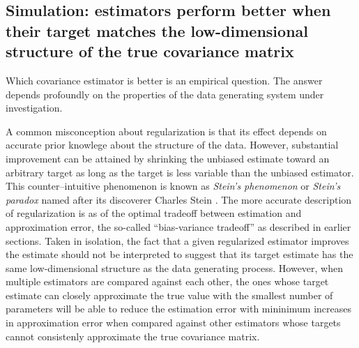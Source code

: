 \subsection*{Simulation: estimators perform better when their target matches the low-dimensional structure of the true covariance matrix}


Which covariance estimator is better is an empirical question.  The answer depends profoundly on the properties of the data generating system under investigation. 

A common misconception about regularization is that its effect depends on accurate prior knowlege about the structure of the data. However, substantial improvement can be attained by shrinking the unbiased estimate toward an arbitrary target as long as the target is less variable than the unbiased estimator.  This counter--intuitive phenomenon is known as \emph{Stein's phenomenon} or \emph{Stein's paradox} \cite{Efron:1977} named after its discoverer Charles Stein \cite{Stein:1956}.
The more accurate description of regularization is as of the optimal tradeoff between estimation and approximation error, the so-called ``bias-variance tradeoff'' as described in earlier sections. 
Taken in isolation, the fact that a given regularized estimator improves the estimate should not be interpreted to suggest that its target estimate has the same low-dimensional structure as the data generating process.   However, when multiple estimators are compared against each other, the ones whose target estimate can closely approximate the true value with the smallest number of parameters will be able to reduce the estimation error with mininimum increases in approximation error when compared against other estimators whose targets cannot consistenly approximate the true covariance matrix. 

